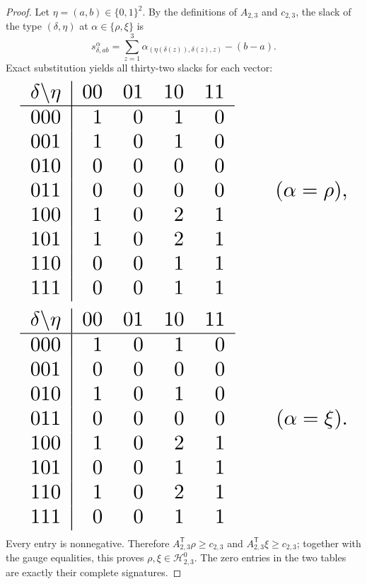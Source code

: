 \documentclass{article}
\begin{document}
\begin{proof}
Let \(\eta=(a,b)\in\{0,1\}^2\). By the definitions of \(A_{2,3}\) and \(c_{2,3}\), the slack of the type \((\delta,\eta)\) at \(\alpha\in\{\rho,\xi\}\) is
\[
s^{\alpha}_{\delta,ab}=\sum_{z=1}^3\alpha_{(\eta(\delta(z)),\delta(z),z)}-(b-a).
\]
Exact substitution yields all thirty-two slacks for each vector:
\[
\makebox[\linewidth][c]{\resizebox{0.98\linewidth}{!}{\par\noindent \makebox[\linewidth][c]{\resizebox{0.98\linewidth}{!}{\(\displaystyle \displaystyle \begin{array}{c|rrrr}\delta\backslash\eta&00&01&10&11\\ \hline 000&1&0&1&0\\ 001&1&0&1&0\\ 010&0&0&0&0\\ 011&0&0&0&0\\ 100&1&0&2&1\\ 101&1&0&2&1\\ 110&0&0&1&1\\ 111&0&0&1&1\end{array}\qquad(\alpha=\rho),\)}}\par\noindent}}
\]
\[
\makebox[\linewidth][c]{\resizebox{0.98\linewidth}{!}{\par\noindent \makebox[\linewidth][c]{\resizebox{0.98\linewidth}{!}{\(\displaystyle \displaystyle \begin{array}{c|rrrr}\delta\backslash\eta&00&01&10&11\\ \hline 000&1&0&1&0\\ 001&0&0&0&0\\ 010&1&0&1&0\\ 011&0&0&0&0\\ 100&1&0&2&1\\ 101&0&0&1&1\\ 110&1&0&2&1\\ 111&0&0&1&1\end{array}\qquad(\alpha=\xi).\)}}\par\noindent}}
\]
Every entry is nonnegative. Therefore \(A_{2,3}^{\mathsf T}\rho\ge c_{2,3}\) and \(A_{2,3}^{\mathsf T}\xi\ge c_{2,3}\); together with the gauge equalities, this proves \(\rho,\xi\in\mathcal H^0_{2,3}\). The zero entries in the two tables are exactly their complete signatures.


\end{proof}
\end{document}
